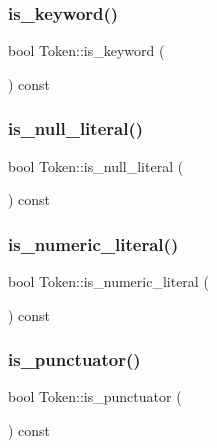 \mbox{\label{class_token_a73de586a62c6a20442a3d5218f248056}} 
\subsubsection{\texorpdfstring{is\+\_\+keyword()}{is\_keyword()}}
{\footnotesize\ttfamily bool Token\+::is\+\_\+keyword (\begin{DoxyParamCaption}{ }\end{DoxyParamCaption}) const}

\mbox{\label{class_token_a164aae8af0eb44720bd198169349c5c6}} 
\subsubsection{\texorpdfstring{is\+\_\+null\+\_\+literal()}{is\_null\_literal()}}
{\footnotesize\ttfamily bool Token\+::is\+\_\+null\+\_\+literal (\begin{DoxyParamCaption}{ }\end{DoxyParamCaption}) const}

\mbox{\label{class_token_acf4f9a4d866ea0b67054b01cd4ea4f0f}} 
\subsubsection{\texorpdfstring{is\+\_\+numeric\+\_\+literal()}{is\_numeric\_literal()}}
{\footnotesize\ttfamily bool Token\+::is\+\_\+numeric\+\_\+literal (\begin{DoxyParamCaption}{ }\end{DoxyParamCaption}) const}

\mbox{\label{class_token_a9c6bbf326f7cec9fef706afe7ae018ad}} 
\subsubsection{\texorpdfstring{is\+\_\+punctuator()}{is\_punctuator()}}
{\footnotesize\ttfamily bool Token\+::is\+\_\+punctuator (\begin{DoxyParamCaption}{ }\end{DoxyParamCaption}) const}

